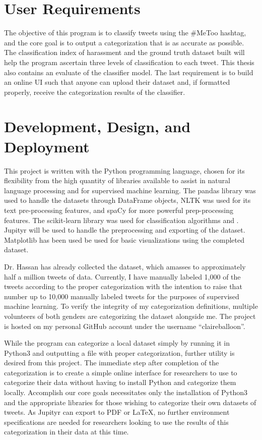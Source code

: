 \section{User Requirements}

The objective of this program is to classify tweets using the \#MeToo hashtag, and the core goal is to output a categorization that is as accurate as possible. The classification index of harassment and the ground truth dataset built will help the program ascertain three levels of classification to each tweet. This thesis also contains an evaluate of the classifier model. The last requirement is to build an online UI such that anyone can upload their dataset and, if formatted properly, receive the categorization results of the classifier.

\section{Development, Design, and Deployment}

This project is written with the Python programming language, chosen for its flexibility from the high quantity of libraries available to assist in natural language processing and for supervised machine learning. The pandas library was used to handle the datasets through DataFrame objects, NLTK was used for its text pre-processing features, and spaCy for more powerful prep-processing features. The scikit-learn library was used for classification algorithms and . Jupityr will be used to handle the preprocessing and exporting of the dataset. Matplotlib has been used be used for basic visualizations using the completed dataset.


Dr. Hassan has already collected the dataset, which amasses to approximately half a million tweets of data. Currently, I have manually labeled 1,000 of the tweets according to the proper categorization with the intention to raise that number up to 10,000 manually labeled tweets for the purposes of supervised machine learning. To verify the integrity of my categorization definitions, multiple volunteers of both genders are categorizing the dataset alongside me. The project is hosted on my personal GitHub account under the username “claireballoon”.

While the program can categorize a local dataset simply by running it in Python3 and outputting a file with proper categorization, further utility is desired from this project. The immediate step after completion of the categorization is to create a simple online interface for researchers to use to categorize their data without having to install Python and categorize them locally. Accomplish our core goals necessitates only the installation of Python3 and the appropriate libraries for those wishing to categorize their own datasets of tweets. As Jupityr can export to PDF or LaTeX, no further environment specifications are needed for researchers looking to use the results of this categorization in their data at this time.

